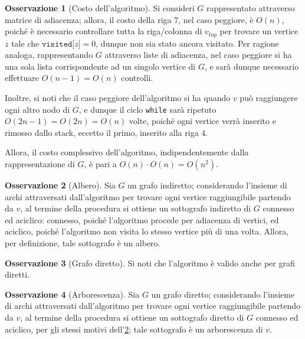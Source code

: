 \documentclass[14pt]{extreport}
\theoremstyle{definition}
\theoremstyle{definition}
\newtheorem{remark}{Osservazione}[subsection]
\begin{document}
\begin{remark}[Costo dell'algoritmo]
    Si consideri $G$ rappresentato attraverso matrice di adiacenza; allora, il costo della riga $7$, nel caso peggiore, è $O(n)$, poiché è necessario controllare tutta la riga/colonna di $v_{top}$ per trovare un vertice $z$ tale che $\texttt{visited[}z\texttt{]} = 0$, dunque non sia stato ancora visitato. Per ragione analoga, rappresentando $G$ attraverso liste di adiacenza, nel caso peggiore si ha una sola lista corrispondente ad un singolo vertice di $G$, e sarà dunque necessario effettuare $O(n - 1) = O(n)$ controlli.

    Inoltre, si noti che il caso peggiore dell'algoritmo si ha quando $v$ può raggiungere ogni altro nodo di $G$, e dunque il ciclo \texttt{while} sarà ripetuto $O(2n - 1) = O(2n) = O(n)$ volte, poiché ogni vertice verrà inserito e rimosso dallo stack, eccetto il primo, inserito alla riga $4$.

    Allora, il costo complessivo dell'algoritmo, indipendentemente dalla rappresentazione di $G$, è pari a $O(n) \cdot O(n) = O(n^2)$.
\end{remark}

\begin{remark}[Albero]
    \label{Sottografo di un grafo indiretto}
    Sia $G$ un grafo indiretto; considerando l'insieme di archi attraversati dall'algoritmo per trovare ogni vertice raggiungibile partendo da $v$, al termine della procedura si ottiene un sottografo indiretto di $G$ connesso ed aciclico: connesso, poiché l'algoritmo procede per adiacenza di vertici, ed aciclico, poiché l'algoritmo non visita lo stesso vertice più di una volta. Allora, per definizione, tale sottografo è un albero.
\end{remark}

\begin{remark}[Grafo diretto]
    Si noti che l'algoritmo è valido anche per grafi diretti.
\end{remark}

\begin{remark}[Arborescenza]
    Sia $G$ un grafo diretto; considerando l'insieme di archi attraversati dall'algoritmo per trovare ogni vertice raggiungibile partendo da $v$, al termine della procedura si ottiene un sottografo diretto di $G$ connesso ed aciclico, per gli stessi motivi dell'\cref{Sottografo di un grafo indiretto}; tale sottografo è un arborescenza di $v$.
\end{remark}
\end{document}
